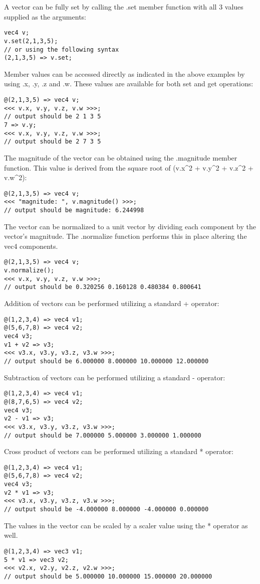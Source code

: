 A vector can be fully set by calling the .set member function with all 3 values
supplied as the arguments:
\begin{verbatim}
vec4 v;
v.set(2,1,3,5);
// or using the following syntax
(2,1,3,5) => v.set;
\end{verbatim}


Member values can be accessed directly as indicated in the above examples by
using .x, .y, .z and .w.  These values are available for both set and get
operations:
\begin{verbatim}
@(2,1,3,5) => vec4 v;
<<< v.x, v.y, v.z, v.w >>>;
// output should be 2 1 3 5
7 => v.y;
<<< v.x, v.y, v.z, v.w >>>;
// output should be 2 7 3 5
\end{verbatim}

The magnitude of the vector can be obtained using the .magnitude member function.
This value is derived from the square root of (v.x^2 + v.y^2 + v.z^2 + v.w^2):
\begin{verbatim}
@(2,1,3,5) => vec4 v;
<<< "magnitude: ", v.magnitude() >>>;
// output should be magnitude: 6.244998
\end{verbatim}

The vector can be normalized to a unit vector by dividing each component by the
vector's magnitude.  The .normalize function performs this in place altering the
vec4 components.
\begin{verbatim}
@(2,1,3,5) => vec4 v;
v.normalize();
<<< v.x, v.y, v.z, v.w >>>;
// output should be 0.320256 0.160128 0.480384 0.800641
\end{verbatim}

Addition of vectors can be performed utilizing a standard + operator:
\begin{verbatim}
@(1,2,3,4) => vec4 v1;
@(5,6,7,8) => vec4 v2;
vec4 v3;
v1 + v2 => v3;
<<< v3.x, v3.y, v3.z, v3.w >>>;
// output should be 6.000000 8.000000 10.000000 12.000000
\end{verbatim}

Subtraction of vectors can be performed utilizing a standard - operator:
\begin{verbatim}
@(1,2,3,4) => vec4 v1;
@(8,7,6,5) => vec4 v2;
vec4 v3;
v2 - v1 => v3;
<<< v3.x, v3.y, v3.z, v3.w >>>;
// output should be 7.000000 5.000000 3.000000 1.000000
\end{verbatim}

Cross product of vectors can be performed utilizing a standard * operator:
\begin{verbatim}
@(1,2,3,4) => vec4 v1;
@(5,6,7,8) => vec4 v2;
vec4 v3;
v2 * v1 => v3;
<<< v3.x, v3.y, v3.z, v3.w >>>;
// output should be -4.000000 8.000000 -4.000000 0.000000
\end{verbatim}

The values in the vector can be scaled by a scaler value using the * operator
as well.
\begin{verbatim}
@(1,2,3,4) => vec3 v1;
5 * v1 => vec3 v2;
<<< v2.x, v2.y, v2.z, v2.w >>>;
// output should be 5.000000 10.000000 15.000000 20.000000
\end{verbatim}

